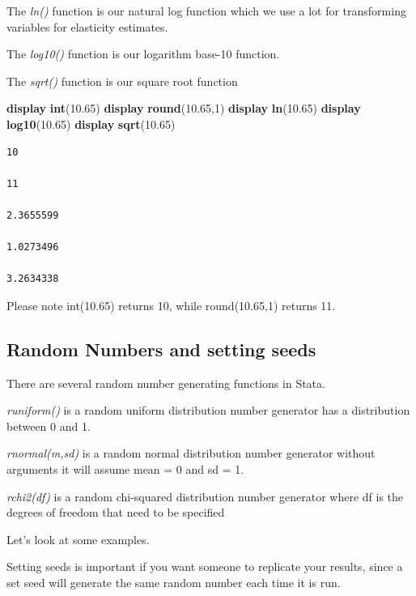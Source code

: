 \documentclass[
]{book}
\newenvironment{Shaded}{\begin{snugshade}}{\end{snugshade}}
\newcommand{\FunctionTok}[1]{\textcolor[rgb]{0.13,0.29,0.53}{\textbf{#1}}}
\newcommand{\KeywordTok}[1]{\textcolor[rgb]{0.13,0.29,0.53}{\textbf{#1}}}
\newcommand{\NormalTok}[1]{#1}
\begin{document}
The \emph{ln()} function is our natural log function which we use a lot for transforming variables for elasticity estimates.

The \emph{log10()} function is our logarithm base-10 function.

The \emph{sqrt()} function is our square root function

\begin{Shaded}
\begin{Highlighting}[]
    \KeywordTok{display} \KeywordTok{int}\NormalTok{(10.65)}
    \KeywordTok{display} \FunctionTok{round}\NormalTok{(10.65,1)}
    \KeywordTok{display} \FunctionTok{ln}\NormalTok{(10.65)}
    \KeywordTok{display} \FunctionTok{log10}\NormalTok{(10.65)}
    \KeywordTok{display} \FunctionTok{sqrt}\NormalTok{(10.65)}
\end{Highlighting}
\end{Shaded}

\begin{verbatim}
10

11

2.3655599

1.0273496

3.2634338
\end{verbatim}

Please note int(10.65) returns 10, while round(10.65,1) returns 11.

\subsection{Random Numbers and setting seeds}\label{random-numbers-and-setting-seeds}

There are several random number generating functions in Stata.

\emph{runiform()} is a random uniform distribution number generator has a distribution between 0 and 1.

\emph{rnormal(m,sd)} is a random normal distribution number generator without arguments it will assume mean = 0 and sd = 1.

\emph{rchi2(df)} is a random chi-squared distribution number generator where df is the degrees of freedom that need to be specified

Let's look at some examples.

Setting seeds is important if you want someone to replicate your results, since a set seed will generate the same random number each time it is run.
\end{document}

